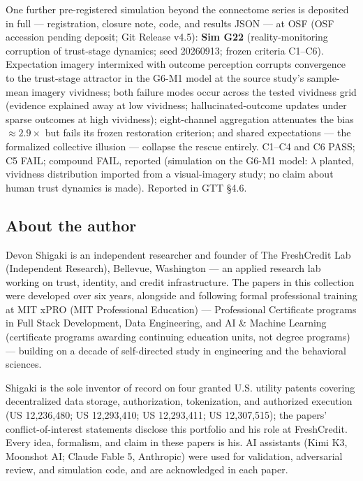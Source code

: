 \documentclass[11pt]{article}
\begin{document}
One further pre-registered simulation beyond the connectome series is
deposited in full --- registration, closure note, code, and results JSON ---
at OSF (OSF accession pending deposit; Git Release v4.5): \textbf{Sim G22} (reality-monitoring corruption of
trust-stage dynamics; seed 20260913; frozen criteria C1--C6). Expectation
imagery intermixed with outcome perception corrupts convergence to the
trust-stage attractor in the G6-M1 model at the source study's sample-mean
imagery vividness; both failure modes occur across the tested vividness
grid (evidence explained away at low vividness; hallucinated-outcome
updates under sparse outcomes at high vividness); eight-channel aggregation
attenuates the bias $\approx$$2.9\times$ but fails its frozen restoration
criterion; and shared expectations --- the formalized collective illusion
--- collapse the rescue entirely. C1--C4 and C6 PASS; C5 FAIL; compound
FAIL, reported
(simulation on the G6-M1 model: $\lambda$ planted, vividness distribution
imported from a visual-imagery study; no claim about human trust dynamics
is made). Reported in GTT \S{}4.6.

\subsection*{About the author}

Devon Shigaki is an independent researcher and founder of The FreshCredit Lab
(Independent Research), Bellevue, Washington --- an applied research lab working
on trust, identity, and credit infrastructure. The papers in this collection
were developed over six years, alongside and following formal professional
training at MIT xPRO (MIT Professional Education) --- Professional Certificate
programs in Full Stack Development, Data Engineering, and AI \& Machine Learning
(certificate programs awarding continuing education units, not degree programs)
--- building on a decade of self-directed study in engineering and the
behavioral sciences.

Shigaki is the sole inventor of record on four granted U.S. utility patents
covering decentralized data storage, authorization, tokenization, and authorized
execution (US 12,236,480; US 12,293,410; US 12,293,411; US 12,307,515); the
papers' conflict-of-interest statements disclose this portfolio and his role at
FreshCredit. Every idea, formalism, and claim in these papers is his. AI
assistants (Kimi K3, Moonshot AI; Claude Fable 5, Anthropic) were used for
validation, adversarial review, and simulation code, and are acknowledged in
each paper.
\end{document}
